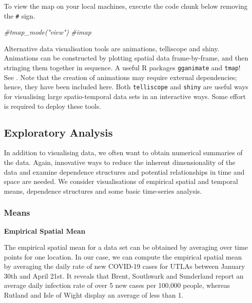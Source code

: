 \documentclass[
]{book}
\newenvironment{Shaded}{\begin{snugshade}}{\end{snugshade}}
\newcommand{\CommentTok}[1]{\textcolor[rgb]{0.56,0.35,0.01}{\textit{#1}}}
\begin{document}
To view the map on your local machines, execute the code chunk below removing the \texttt{\#} sign.

\begin{Shaded}
\begin{Highlighting}[]
\CommentTok{#tmap_mode("view")}
\CommentTok{#imap}
\end{Highlighting}
\end{Shaded}

Alternative data visualisation tools are animations, telliscope and shiny. Animations can be constructed by plotting spatial data frame-by-frame, and then stringing them together in sequence. A useful R packages \texttt{gganimate} and \texttt{tmap}! See \citet{Lovelace_et_al_2020_book}. Note that the creation of animations may require external dependencies; hence, they have been included here. Both \texttt{telliscope} and \texttt{shiny} are useful ways for visualising large spatio-temporal data sets in an interactive ways. Some effort is required to deploy these tools.

\hypertarget{exploratory-analysis-1}{%
\subsection{Exploratory Analysis}\label{exploratory-analysis-1}}

In addition to visualising data, we often want to obtain numerical summaries of the data. Again, innovative ways to reduce the inherent dimensionality of the data and examine dependence structures and potential relationships in time and space are needed. We consider visualisations of empirical spatial and temporal means, dependence structures and some basic time-series analysis.

\hypertarget{means}{%
\subsubsection{Means}\label{means}}

\textbf{Empirical Spatial Mean}

The empirical spatial mean for a data set can be obtained by averaging over time points for one location. In our case, we can compute the empirical spatial mean by averaging the daily rate of new COVID-19 cases for UTLAs between January 30th and April 21st. It reveals that Brent, Southwark and Sunderland report an average daily infection rate of over 5 new cases per 100,000 people, whereas Rutland and Isle of Wight display an average of less than 1.
\end{document}
